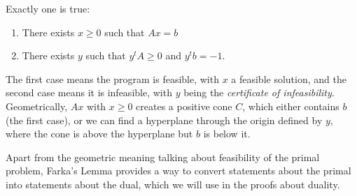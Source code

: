 \documentclass{article}
\begin{document}
\begin{farkas}
	Exactly one is true:
	\begin{enumerate}
		\item There exists $x \ge 0$ such that $Ax = b$
		\item There exists $y$ such that $y^t A \ge 0$ and $y^t b = -1$.
	\end{enumerate}
\end{farkas}

The first case means the program is feasible, with $x$ a feasible solution, and the second case
means it is infeasible, with $y$ being the \emph{certificate of infeasibility}. Geometrically, $Ax$
with $x \ge 0$ creates a positive cone $C$, which either contains $b$ (the first case), or we can
find a hyperplane through the origin defined by $y$, where the cone is above the hyperplane but $b$
is below it.

Apart from the geometric meaning talking about feasibility of the primal problem, Farka's Lemma
provides a way to convert statements about the primal into statements about the dual, which we will
use in the proofs about duality.
\end{document}
